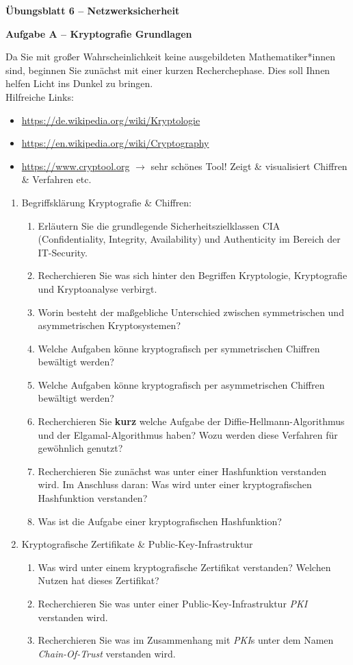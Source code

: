 \documentclass[paper=a4,fontsize=11pt]{scrartcl}%
\numberwithin{equation}{section}
\begin{document}
\begin{center}
\Large{\textbf{Übungsblatt 6 -- Netzwerksicherheit}}
\end{center}


\begin{center}\Large{\textbf{Aufgabe A -- Kryptografie Grundlagen}}\end{center}
Da Sie mit großer Wahrscheinlichkeit keine ausgebildeten Mathematiker*innen sind, beginnen Sie zunächst mit einer kurzen Recherchephase. Dies soll Ihnen helfen Licht ins Dunkel zu bringen.\\
Hilfreiche Links:
\begin{itemize}
	\item \url{https://de.wikipedia.org/wiki/Kryptologie}
	\item \url{https://en.wikipedia.org/wiki/Cryptography}
	\item \url{https://www.cryptool.org} $\rightarrow$ sehr schönes Tool! Zeigt \& visualisiert Chiffren \& Verfahren etc.
\end{itemize}
\begin{enumerate}
	\item Begriffsklärung Kryptografie \& Chiffren:
	\begin{enumerate}
		\item Erläutern Sie die grundlegende Sicherheitszielklassen CIA (Confidentiality, Integrity, Availability) und Authenticity im Bereich der IT-Security.
		\item Recherchieren Sie was sich hinter den Begriffen Kryptologie, Kryptografie und Kryptoanalyse verbirgt.
		\item Worin besteht der maßgebliche Unterschied zwischen symmetrischen und asymmetrischen Kryptosystemen?
		\item Welche Aufgaben könne kryptografisch per symmetrischen Chiffren bewältigt werden?
		\item Welche Aufgaben könne kryptografisch per asymmetrischen Chiffren bewältigt werden?
		\item Recherchieren Sie \textbf{kurz} welche Aufgabe der Diffie-Hellmann-Algorithmus und der Elgamal-Algorithmus haben? Wozu werden diese Verfahren für gewöhnlich genutzt?
		\item Recherchieren Sie zunächst was unter einer Hashfunktion verstanden wird. Im Anschluss daran: Was wird unter einer kryptografischen Hashfunktion verstanden?
		\item  Was ist die Aufgabe einer kryptografischen Hashfunktion?
	\end{enumerate}
	\item Kryptografische Zertifikate \& Public-Key-Infrastruktur
	\begin{enumerate}
		\item Was wird unter einem kryptografische Zertifikat verstanden? Welchen Nutzen hat dieses Zertifikat?
		\item Recherchieren Sie was unter einer Public-Key-Infrastruktur \emph{PKI} verstanden wird.
		\item Recherchieren Sie was im Zusammenhang mit \emph{PKI}s unter dem Namen \emph{Chain-Of-Trust} verstanden wird.
	\end{enumerate}
\end{enumerate}
\end{document}
